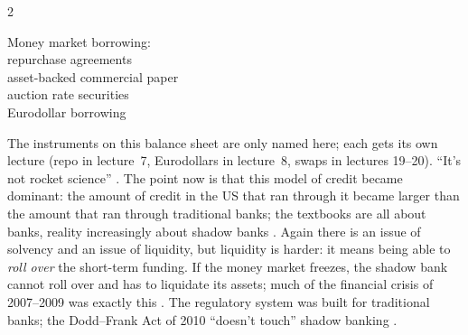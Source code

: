 \begin{paracol}{2}
\begin{taccts}
%
{Money market borrowing:\\\quad repurchase agreements\\\quad asset-backed commercial paper\\\quad auction rate securities\\\quad Eurodollar borrowing}
\end{taccts}
The instruments on this balance sheet are only named here; each gets its own lecture (repo in lecture~7,
Eurodollars in lecture~8, swaps in lectures 19--20). ``It's not rocket science'' . The point now is
that this model of credit became dominant: the amount of credit in the US that ran through it became larger than
the amount that ran through traditional banks; the textbooks are all about banks, reality increasingly about
shadow banks . Again there is an issue of solvency and an issue of liquidity, but liquidity is
harder: it means being able to \emph{roll over} the short-term funding. If the money market freezes, the shadow
bank cannot roll over and has to liquidate its assets; much of the financial crisis of 2007--2009 was exactly
this . The regulatory system was built for traditional banks; the Dodd--Frank Act of 2010 ``doesn't
touch'' shadow banking .


\end{paracol}
